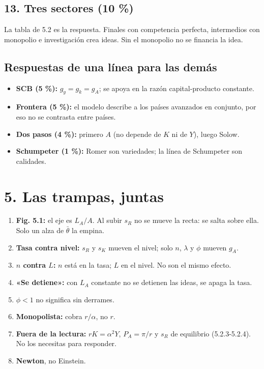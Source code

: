 \documentclass[11pt,a4paper]{article}
\begin{document}
\subsection*{13. Tres sectores (10 \%)}

La tabla de 5.2 es la respuesta. Finales con competencia perfecta, intermedios con monopolio e investigación crea ideas. Sin el monopolio no se financia la idea.

\subsection*{Respuestas de una línea para las demás}

\begin{itemize}[leftmargin=*,itemsep=2pt,topsep=2pt]
\item \textbf{SCB (5 \%):} $g_y = g_k = g_A$; se apoya en la razón capital-producto constante.
\item \textbf{Frontera (5 \%):} el modelo describe a los países avanzados en conjunto, por eso no se contrasta entre países.
\item \textbf{Dos pasos (4 \%):} primero $A$ (no depende de $K$ ni de $Y$), luego Solow.
\item \textbf{Schumpeter (1 \%):} Romer son variedades; la línea de Schumpeter son calidades.
\end{itemize}

\section*{5. Las trampas, juntas}

\begin{enumerate}[leftmargin=*,itemsep=2pt,topsep=2pt]
\item \textbf{Fig. 5.1:} el eje es $L_A/A$. Al subir $s_R$ no se mueve la recta: se salta sobre ella. Solo un alza de $\bar\theta$ la empina.
\item \textbf{Tasa contra nivel:} $s_R$ y $s_K$ mueven el nivel; solo $n$, $\lambda$ y $\phi$ mueven $g_A$.
\item \textbf{$n$ contra $L$:} $n$ está en la tasa; $L$ en el nivel. No son el mismo efecto.
\item \textbf{«Se detiene»:} con $L_A$ constante no se detienen las ideas, se apaga la tasa.
\item \textbf{$\phi < 1$} no significa sin derrames.
\item \textbf{Monopolista:} cobra $r/\alpha$, no $r$.
\item \textbf{Fuera de la lectura:} $rK = \alpha^2 Y$, $P_A = \pi/r$ y $s_R$ de equilibrio (5.2.3-5.2.4). No los necesitas para responder.
\item \textbf{Newton}, no Einstein.
\end{enumerate}
\end{document}
